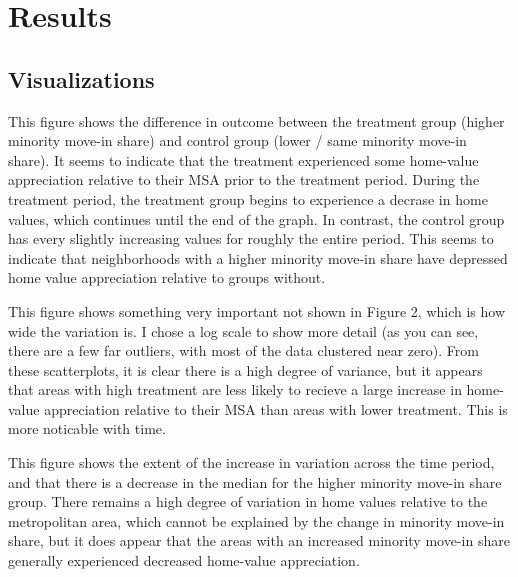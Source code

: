 \documentclass{article}
\begin{document}
\section{Results}
\subsection{Visualizations}
\begin{center}
\end{center}
This figure shows the difference in outcome between the treatment group (higher minority move-in share) and control group (lower / same minority move-in share). It seems to indicate that the treatment experienced some home-value appreciation relative to their MSA prior to the treatment period. During the treatment period, the treatment group begins to experience a decrase in home values, which continues until the end of the graph. In contrast, the control group has every slightly increasing values for roughly the entire period. This seems to indicate that neighborhoods with a higher minority move-in share have depressed home value appreciation relative to groups without.
\begin{center}
\end{center}
This figure shows something very important not shown in Figure 2, which
is how wide the variation is. I chose a log scale to show more detail
(as you can see, there are a few far outliers, with most of the data
clustered near zero). From these scatterplots, it is clear there is a high degree of variance, but it appears that areas with high treatment are less likely to recieve a large increase in home-value appreciation relative to their MSA than areas with lower treatment. This is more noticable with time.
\begin{center}
\end{center}    
This figure shows the extent of the increase in variation across the
time period, and that there is a decrease in the median for the
higher minority move-in share group. There remains a high
degree of variation in home values relative to the metropolitan area,
which cannot be explained by the change in minority move-in share, but it does appear that the areas with an increased minority move-in share generally experienced decreased home-value appreciation. 
\end{document}
